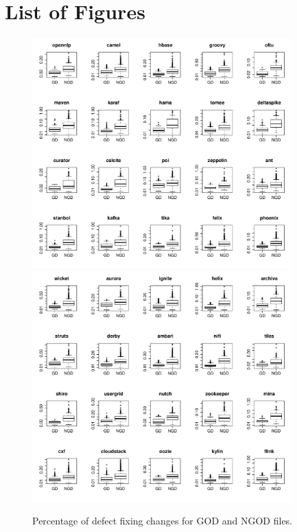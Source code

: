 \section{List of Figures}

\begin{figure}[tb]
	\centering
	\includegraphics[width=100mm]{figures/chapter4/RQ1_boxplots_god_1}
	\includegraphics[width=100mm]{figures/chapter4/RQ1_boxplots_god_2}
	\caption{Percentage of defect fixing changes for GOD and NGOD files.}
	\label{figure:percentage_of_defects_god_vs_ngod}
\end{figure}



